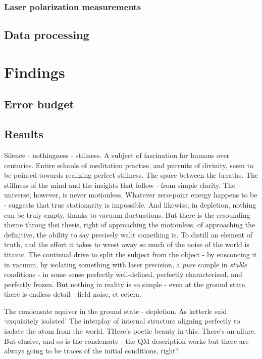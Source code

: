 \subsubsection*{Laser polarization measurements}
\subsection{Data processing}\label{ssec:to-proc}
\section{Findings}\label{sec:to-results}
\subsection{Error budget}\label{ssec:to-errs}
\subsection{Results}\label{ssec:to-findings}

Silence - nothingness - stillness.
	A subject of fascination for humans
over centuries.
	Entire schools of meditation practise, and pursuits of
divinity, seem to be pointed towards realizing perfect stillness.
	The
space between the breaths.
	The stillness of the mind and the insights
that follow - from simple clarity.
	The universe, however, is never
motionless.
	Whatever zero-point energy happens to be - suggests that
true stationarity is impossible.
	And likewise, in depletion, nothing can
be truly empty, thanks to vacuum fluctuations.
	But there is the
resounding theme throug thsi thesis, right of approaching the
motionless, of approaching the definitive, the ability to say precisely
waht something is.
	To distill an element of truth, and the effort it
takes to wrest away so much of the noise of the world is titanic.
	The
continual drive to split the subject from the object - by ensconcing it
in vacuum, by isolating something with laser precision, a \emph{pure}
sample in \emph{stable} conditions - in some sense perfectly
well-defined, perfectly characterized, and perfectly frozen.
	But nothing
in reality is so simple - even at the ground state, there is endless
detail - field noise, et cetera.

The condensate aquiver in the ground state - depletion.
	As ketterle said
`exquisitely isolated' The interplay of internal structure aligning
perfectly to isolate the atom from the world.
	THere's poetic beauty in
this.
	There's an allure.
	But elusive, and so is the condensate - the QM
description works but there are always going to be traces of the initial
conditions, right?

